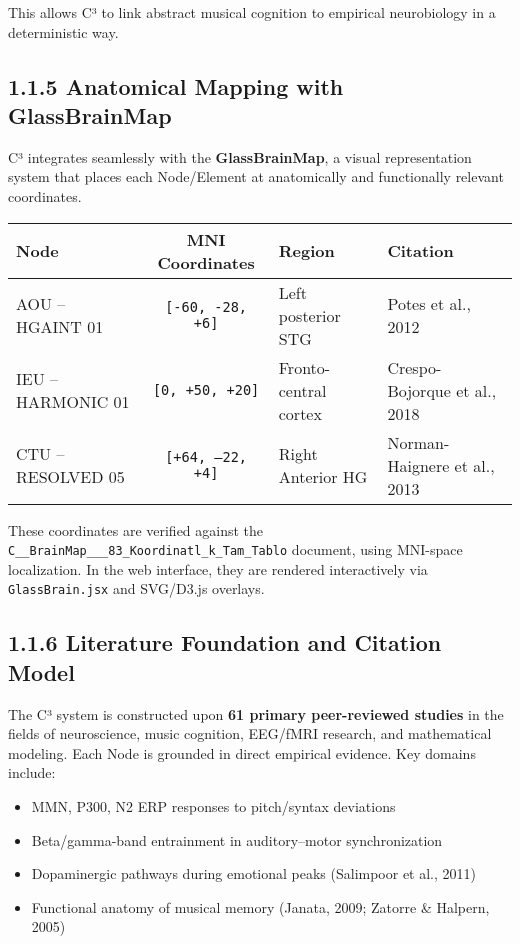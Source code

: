 This allows C³ to link abstract musical cognition to empirical neurobiology in a deterministic way.

\subsection*{1.1.5 Anatomical Mapping with GlassBrainMap}

C³ integrates seamlessly with the \textbf{GlassBrainMap}, a visual representation system that places each Node/Element at anatomically and functionally relevant coordinates.

\begin{center}
\begin{tabular}{|l|c|l|l|}
\hline
\textbf{Node} & \textbf{MNI Coordinates} & \textbf{Region} & \textbf{Citation} \\
\hline
AOU – HGAINT 01 & \texttt{[-60, -28, +6]} & Left posterior STG & Potes et al., 2012 \\
IEU – HARMONIC 01 & \texttt{[0, +50, +20]} & Fronto-central cortex & Crespo-Bojorque et al., 2018 \\
CTU – RESOLVED 05 & \texttt{[+64, –22, +4]} & Right Anterior HG & Norman-Haignere et al., 2013 \\
\hline
\end{tabular}
\end{center}

These coordinates are verified against the \texttt{C\_\_BrainMap\_\_\_83\_Koordinatl\_k\_Tam\_Tablo} document, using MNI-space localization. In the web interface, they are rendered interactively via \texttt{GlassBrain.jsx} and SVG/D3.js overlays.

\subsection*{1.1.6 Literature Foundation and Citation Model}

The C³ system is constructed upon \textbf{61 primary peer-reviewed studies} in the fields of neuroscience, music cognition, EEG/fMRI research, and mathematical modeling. Each Node is grounded in direct empirical evidence. Key domains include:

\begin{itemize}
    \item MMN, P300, N2 ERP responses to pitch/syntax deviations
    \item Beta/gamma-band entrainment in auditory–motor synchronization
    \item Dopaminergic pathways during emotional peaks (Salimpoor et al., 2011)
    \item Functional anatomy of musical memory (Janata, 2009; Zatorre \& Halpern, 2005)
\end{itemize}

